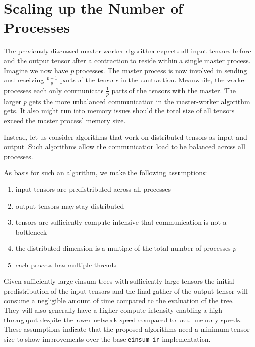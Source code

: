 \section{Scaling up the Number of Processes}

The previously discussed master-worker algorithm expects all input tensors before and the output tensor after a contraction to reside within a single master process.
Imagine we now have $p$ processes.
The master process is now involved in sending and receiving $\frac{p-1}{p}$ parts of the tensors in the contraction.
Meanwhile, the worker processes each only communicate $\frac{1}{p}$ parts of the tensors with the master.
The larger $p$ gets the more unbalanced communication in the master-worker algorithm gets.
It also might run into memory issues should the total size of all tensors exceed the master process' memory size.

Instead, let us consider algorithms that work on distributed tensors as input and output.
Such algorithms allow the communication load to be balanced across all processes.

As basis for such an algorithm, we make the following assumptions:
\begin{enumerate}
    \item input tensors are predistributed across all processes
    \item output tensors may stay distributed
    \item tensors are sufficiently compute intensive that communication is not a bottleneck
    \item the distributed dimension is a multiple of the total number of processes $p$
    \item each process has multiple threads.
\end{enumerate}


Given sufficiently large einsum trees with sufficiently large tensors the initial predistribution of the input tensors and the final gather of the output tensor will consume a negligible amount of time compared to the evaluation of the tree.
They will also generally have a higher compute intensity enabling a high throughput despite the lower network speed compared to local memory speeds.
These assumptions indicate that the proposed algorithms need a minimum tensor size to show improvements over the base \texttt{einsum\_ir} implementation.

